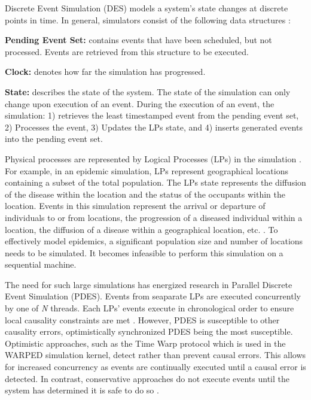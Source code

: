 \documentclass[a4paper]{article}
\begin{document}
\indent
Discrete Event Simulation (DES) models a system's state changes at discrete
points in time.  In general, simulators consist of the following data structures
\cite{fujimoto}:\par
\textbf{Pending Event Set:} contains events that have been scheduled, but not
processed.  Events are retrieved from this structure to be executed.\par
\textbf{Clock:} denotes how far the simulation has progressed.\par
\textbf{State:} describes the state of the system.
The state of the simulation can only change upon execution of an event.
During the execution of an event, the simulation: 1) retrieves the least 
timestamped event from the pending event set, 2) Processes the event, 3) Updates
the LPs state, and 4) inserts generated events into the pending event set.
\par

\indent
Physical processes are represented by Logical Processes (LPs) in the simulation
\cite{des_misra}.  For example, in an epidemic simulation, LPs represent
geographical locations containing a subset of the total population.  The LPs
state represents the diffusion of the disease within the location and the status
of the occupants within the location.  Events in this simulation represent the
arrival or departure of individuals to or from locations, the progression of a
diseased individual within a location, the diffusion of a disease within a
geographical location, etc. \cite{epidemic}. To effectively model epidemics, a
significant population size and number of locations needs to be simulated.  It
becomes infeasible to perform this simulation on a sequential machine.  
\par

The need for such large simulations has energized research in Parallel Discrete
Event Simulation (PDES).  Events from seaparate LPs are executed concurrently by
one of \textit{N} threads.  Each LPs' events execute in chronological
order to ensure local causality constraints are met \cite{fujimoto}.  However,
PDES is susceptible to other causality errors, optimistically synchronized PDES
being the most susceptible.  Optimistic approaches, such as the Time Warp
protocol which is used in the WARPED simulation kernel, detect rather than
prevent causal errors.  This allows for increased concurrency as events are
continually executed until a causal error is detected.  In contrast,
conservative approaches do not execute events until the system has determined it
is safe to do so \cite{fujimoto}.
\par
\end{document}
